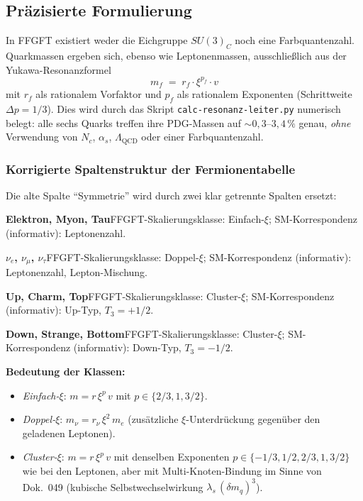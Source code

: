 \subsection*{Präzisierte Formulierung}

In FFGFT existiert weder die Eichgruppe $SU(3)_C$ noch eine
Farbquantenzahl. Quarkmassen ergeben sich, ebenso wie Leptonenmassen,
ausschließlich aus der Yukawa-Resonanzformel
\begin{equation}
  m_f \;=\; r_f \cdot \xi^{p_f} \cdot v
  \tag{190.13}
\end{equation}
mit $r_f$ als rationalem Vorfaktor und $p_f$ als rationalem Exponenten
(Schrittweite $\Delta p = 1/3$). Dies wird durch das Skript
\texttt{calc-resonanz-leiter.py} numerisch belegt: alle sechs Quarks
treffen ihre PDG-Massen auf $\sim 0{,}3\text{--}3{,}4\,\%$ genau,
\emph{ohne} Verwendung von $N_c$, $\alpha_s$, $\Lambda_{\text{QCD}}$
oder einer Farbquantenzahl.

\subsubsection*{Korrigierte Spaltenstruktur der Fermionentabelle}

Die alte Spalte \enquote{Symmetrie} wird durch zwei klar getrennte
Spalten ersetzt:

\smallskip\noindent \textbf{Elektron, Myon, Tau}\quad FFGFT-Skalierungsklasse: Einfach-$\xi$; SM-Korrespondenz (informativ): Leptonenzahl.

\smallskip\noindent \textbf{$\nu_e$, $\nu_\mu$, $\nu_\tau$}\quad FFGFT-Skalierungsklasse: Doppel-$\xi$; SM-Korrespondenz (informativ): Leptonenzahl, Lepton-Mischung.

\smallskip\noindent \textbf{Up, Charm, Top}\quad FFGFT-Skalierungsklasse: Cluster-$\xi$; SM-Korrespondenz (informativ): Up-Typ, $T_3 = +1/2$.

\smallskip\noindent \textbf{Down, Strange, Bottom}\quad FFGFT-Skalierungsklasse: Cluster-$\xi$; SM-Korrespondenz (informativ): Down-Typ, $T_3 = -1/2$.

\medskip


\textbf{Bedeutung der Klassen:}
\begin{itemize}
  \item \emph{Einfach-$\xi$}: $m = r\,\xi^p\,v$ mit $p \in \{2/3, 1, 3/2\}$.
  \item \emph{Doppel-$\xi$}: $m_\nu = r_\nu\,\xi^2\,m_e$
        (zusätzliche $\xi$-Unterdrückung gegenüber den geladenen Leptonen).
  \item \emph{Cluster-$\xi$}: $m = r\,\xi^p\,v$ mit denselben Exponenten
        $p \in \{-1/3, 1/2, 2/3, 1, 3/2\}$ wie bei den Leptonen, aber mit
        Multi-Knoten-Bindung im Sinne von Dok.~049 (kubische
        Selbstwechselwirkung $\lambda_s\,(\delta m_q)^3$).
\end{itemize}

